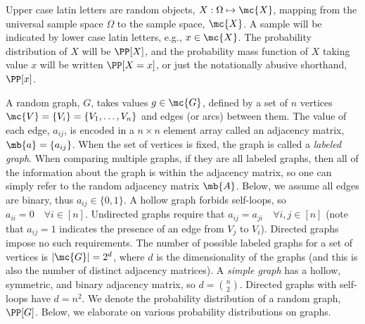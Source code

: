
Upper case latin letters are random objects, $X: \Omega \mapsto \mc{X}$, mapping from the universal sample space $\Omega$ to the sample space, $\mc{X}$.  A sample will be indicated by lower case latin letters, e.g., $x \in \mc{X}$.  The probability distribution of $X$ will be $\PP[X]$, and the probability mass function of $X$ taking value $x$ will be written $\PP[X=x]$, or just the notationally abusive shorthand, $\PP[x]$. 




A random graph, $G$, takes values $g \in \mc{G}$, defined by a set of $n$ vertices $\mc{V}=\{V_i\}=\{V_1,\ldots,V_n\}$ and edges (or arcs) between them. The value of each edge, $a_{ij}$, is encoded in a $n \times n$ element array called an adjacency matrix, $\mb{a}=\{a_{ij}\}$.  When the set of vertices is fixed, the graph is called a \emph{labeled graph}.  When comparing multiple graphs, if they are all labeled graphs, then all of the information about the graph is within the adjacency matrix, so one can simply refer to the random adjacency matrix $\mb{A}$.   Below, we assume all edges are binary, thus $a_{ij} \in \{0,1\}$. A hollow graph forbids self-loops, so $a_{ii}=0\quad \forall i \in [n]$. Undirected graphs require that $a_{ij}=a_{ji}\quad \forall i,j \in [n]$ (note that $a_{ij}=1$ indicates the presence of an edge from $V_j$ to $V_i$). Directed graphs impose no such requirements.  The number of possible labeled graphs for a set of vertices is $|\mc{G}|=2^d$, where $d$ is the dimensionality of the graphs (and this is also the number of distinct adjacency matrices).  A \emph{simple graph} has a hollow, symmetric, and binary adjacency matrix, so $d={n \choose 2}$.  Directed graphs with self-loops have $d=n^2$.  We denote the probability distribution of a random graph, $\PP[G]$.  Below, we elaborate on various probability distributions on graphs.   



